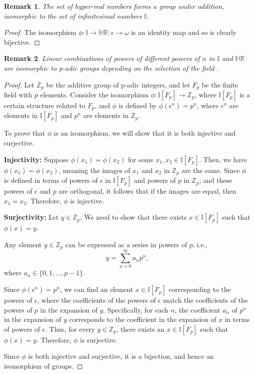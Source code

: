 \documentclass[10pt, oneside]{article}
\newcommand{\I}{\mathbb{I}}
\newcommand{\HR}{\mathbb{HR}}
\newtheorem{rem}{Remark}
\begin{document}
\begin{rem}
    The set of hyper-real numbers forms a group under addition, isomorphic to the set of infinitesimal numbers \( \I \).
\end{rem}
\begin{proof}
    The isomorphism $\phi: \I \to \HR: \epsilon \to \omega$ is an identity map and so is clearly bijective. 
\end{proof}
\begin{rem}
    Linear combinations of powers of different powers of $n$ in $\I$ and $\HR$ are isomorphic to p-adic groups depending on the selection of the field \cite{gouvea2003}. 
\end{rem}
\begin{proof}
    Let \( \mathbb{Z}_p \) be the additive group of p-adic integers, and let \( F_p \) be the finite field with \( p \) elements. Consider the isomorphism \( \phi: \mathbb{I}[F_p] \to \mathbb{Z}_p \), where \( \mathbb{I}[F_p] \) is a certain structure related to \( F_p \), and \( \phi \) is defined by \( \phi(\epsilon^n) = p^n \), where \( \epsilon^n \) are elements in \( \mathbb{I}[F_p] \) and \( p^n \) are elements in \( \mathbb{Z}_p \).

    To prove that \( \phi \) is an isomorphism, we will show that it is both injective and surjective.

    \textbf{Injectivity:} Suppose \( \phi(x_1) = \phi(x_2) \) for some \( x_1, x_2 \in \mathbb{I}[F_p] \). Then, we have \( \phi(x_1) = \phi(x_2) \), meaning the images of \( x_1 \) and \( x_2 \) in \( \mathbb{Z}_p \) are the same. Since \( \phi \) is defined in terms of powers of \( \epsilon \) in \( \mathbb{I}[F_p] \) and powers of \( p \) in \( \mathbb{Z}_p \), and these powers of \( \epsilon \) and \( p \) are orthogonal, it follows that if the images are equal, then \( x_1 = x_2 \). Therefore, \( \phi \) is injective.

    \textbf{Surjectivity:} Let \( y \in \mathbb{Z}_p \). We need to show that there exists \( x \in \mathbb{I}[F_p] \) such that \( \phi(x) = y \). 

    Any element \( y \in \mathbb{Z}_p \) can be expressed as a series in powers of \( p \), i.e.,
    \[
    y = \sum_{n=0}^{\infty} a_n p^n,
    \]
    where \( a_n \in \{0, 1, \dots, p-1\} \).

    Since \( \phi(\epsilon^n) = p^n \), we can find an element \( x \in \mathbb{I}[F_p] \) corresponding to the powers of \( \epsilon \), where the coefficients of the powers of \( \epsilon \) match the coefficients of the powers of \( p \) in the expansion of \( y \). Specifically, for each \( n \), the coefficient \( a_n \) of \( p^n \) in the expansion of \( y \) corresponds to the coefficient in the expansion of \( x \) in terms of powers of \( \epsilon \). Thus, for every \( y \in \mathbb{Z}_p \), there exists an \( x \in \mathbb{I}[F_p] \) such that \( \phi(x) = y \). Therefore, \( \phi \) is surjective.

    Since \( \phi \) is both injective and surjective, it is a bijection, and hence an isomorphism of groups.
\end{proof}
\end{document}
